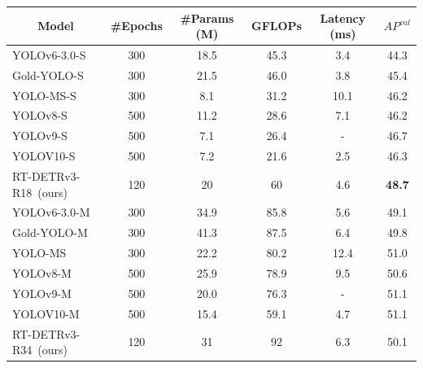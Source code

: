 \documentclass[10pt,twocolumn,letterpaper]{article}
\begin{document}
\begin{table}[t]
\centering
\setlength{\tabcolsep}{7.5pt} %
\renewcommand{\arraystretch}{1.25}
\begin{tabular}{l|cccc|c}

\hline
\multicolumn{1}{c|}{Model}                    & \#Epochs & \#Params (M) & GFLOPs & Latency (ms) & $AP^{val}$            \\ \hline
YOLOv6-3.0-S~\cite{li2022yolov6}              & 300       & 18.5         & 45.3   & 3.4          & 44.3          \\
Gold-YOLO-S~\cite{wang2024gold-yolo}          & 300       & 21.5         & 46.0   & 3.8          & 45.4          \\
YOLO-MS-S~\cite{chen2023yolo-ms}              & 300       & 8.1          & 31.2   & 10.1         & 46.2          \\
YOLOv8-S~\cite{yolov8}                        & 500       & 11.2         & 28.6   & 7.1          & 46.2          \\
YOLOv9-S~\cite{wang2024yolov9}                & 500       & 7.1          & 26.4   & -            & 46.7          \\
YOLOV10-S~\cite{wang2024yolov10}              & 500       & 7.2          & 21.6   & 2.5          & 46.3          \\
\rowcolor[HTML]{ECF4FF} RT-DETRv3-R18~(ours)  & 120       & 20           & 60     & 4.6          & \textbf{48.7} \\ \hline
YOLOv6-3.0-M~\cite{li2022yolov6}              & 300       & 34.9         & 85.8   & 5.6          & 49.1          \\
Gold-YOLO-M~\cite{wang2024gold-yolo}          & 300       & 41.3         & 87.5   & 6.4          & 49.8          \\
YOLO-MS~\cite{chen2023yolo-ms}                & 300       & 22.2         & 80.2   & 12.4         & 51.0          \\
YOLOv8-M~\cite{yolov8}                        & 500       & 25.9         & 78.9   & 9.5          & 50.6          \\
YOLOv9-M~\cite{wang2024yolov9}                & 500       & 20.0         & 76.3   & -            & 51.1          \\
YOLOV10-M~\cite{wang2024yolov10}              & 500       & 15.4         & 59.1   & 4.7          & 51.1          \\
\rowcolor[HTML]{ECF4FF} RT-DETRv3-R34~(ours)  & 120       & 31           & 92     & 6.3          & 50.1          \\

\end{tabular}
\end{table}
\end{document}
